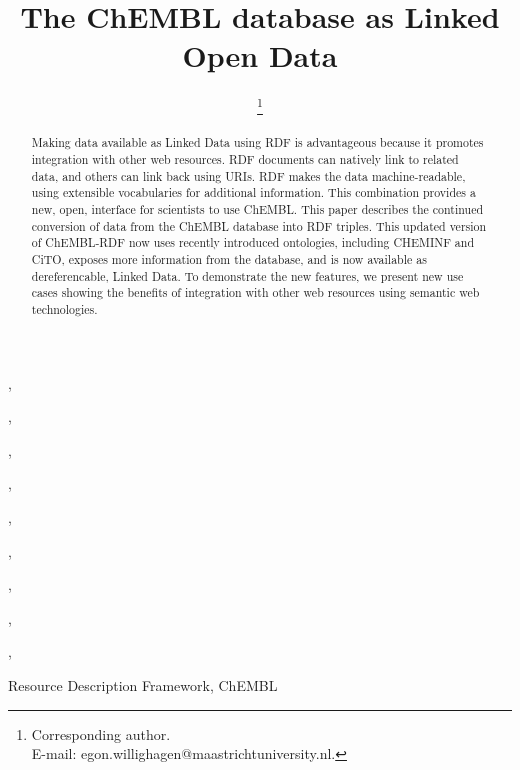 \documentclass[sw]{iosart2c}
\begin{document}
\newcommand{\url}[1]{#1}

\begin{frontmatter}

\title{The ChEMBL database as Linked Open Data}



\author[A]{ \thanks{Corresponding author.\\ E-mail: egon.willighagen@maastrichtuniversity.nl.}}
\author[A]{ }
\author[B]{ },
\author[C]{ },
\author[D]{ },
\author[D]{ },
\author[E]{ },
\author[F]{ },
\author[F]{ },
\author[F]{ },
\author[G]{ },
\author[G]{ }

\address[A]{Department of Bioinformatics - BiGCaT, Maastricht University, P.O. Box 616, UNS50 Box 19, NL-6200 MD, Maastricht, The Netherlands}
\address[B]{Department of Pharmaceutical Biosciences, Uppsala University, PO Box 591, SE-751 24, Uppsala, Sweden}
\address[C]{University of Queensland, St Lucia, Qld 4072, Australia}
\address[D]{Royal Society of Chemistry, 904 Tamaras Circle, Wake Forest, NC 27587, U.S.A.}
\address[E]{Chemoinformatics and Metabolism, European Bioinformatics Institute, POSTAL CODE, Hinxton, United Kingdom}
\address[F]{EMBL-European Bioinformatics Institute, Wellcome Trust Genome Campus, Hinxton, Cambridgeshire, CB10 1SD, United Kingdom}
\address[G]{School of Informatics and Computing, Indiana University, Bloomington, IN, U.S.A.}

\begin{abstract}
Making data available as Linked Data using RDF is advantageous because it promotes integration with other web resources.
RDF documents can natively link to related data, and others can link back using URIs. RDF makes the data machine-readable,
using extensible vocabularies for additional information. This combination provides a new, open, interface for scientists to use ChEMBL.
This paper describes the continued conversion of data from the ChEMBL database into RDF triples.
This updated version of ChEMBL-RDF now uses recently introduced ontologies, including CHEMINF and CiTO,
exposes more information from the database, and is now available as dereferencable, Linked Data.
To demonstrate the new features, we present new use cases showing the benefits of integration with
other web resources using semantic web technologies.
\end{abstract}

\begin{keyword}
Resource Description Framework, ChEMBL
\end{keyword}

\end{frontmatter}
\end{document}
